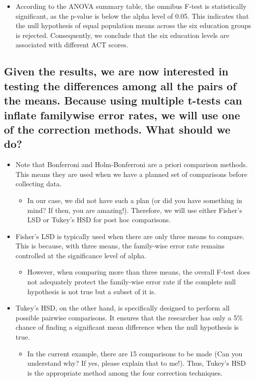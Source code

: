 \documentclass[
]{book}
\providecommand{\tightlist}{%
  \setlength{\itemsep}{0pt}\setlength{\parskip}{0pt}}
\begin{document}
\begin{itemize}
\tightlist
\item
  According to the ANOVA summary table, the omnibus F-test is statistically significant, as the p-value is below the alpha level of 0.05. This indicates that the null hypothesis of equal population means across the six education groups is rejected. Consequently, we conclude that the six education levels are associated with different ACT scores.
\end{itemize}

\subsection{Given the results, we are now interested in testing the differences among all the pairs of the means. Because using multiple t-tests can inflate familywise error rates, we will use one of the correction methods. What should we do?}\label{given-the-results-we-are-now-interested-in-testing-the-differences-among-all-the-pairs-of-the-means.-because-using-multiple-t-tests-can-inflate-familywise-error-rates-we-will-use-one-of-the-correction-methods.-what-should-we-do}

\begin{itemize}
\tightlist
\item
  Note that Bonferroni and Holm-Bonferroni are a priori comparison methods. This means they are used when we have a planned set of comparisons before collecting data.

  \begin{itemize}
  \tightlist
  \item
    In our case, we did not have such a plan (or did you have something in mind? If then, you are amazing!). Therefore, we will use either Fisher's LSD or Tukey's HSD for post hoc comparisons.
  \end{itemize}
\item
  Fisher's LSD is typically used when there are only three means to compare. This is because, with three means, the family-wise error rate remains controlled at the significance level of alpha.

  \begin{itemize}
  \tightlist
  \item
    However, when comparing more than three means, the overall F-test does not adequately protect the family-wise error rate if the complete null hypothesis is not true but a subset of it is.
  \end{itemize}
\item
  Tukey's HSD, on the other hand, is specifically designed to perform all possible pairwise comparisons. It ensures that the researcher has only a 5\% chance of finding a significant mean difference when the null hypothesis is true.

  \begin{itemize}
  \tightlist
  \item
    In the current example, there are 15 comparisons to be made (Can you understand why? If yes, please explain that to me!). Thus, Tukey's HSD is the appropriate method among the four correction techniques.
  \end{itemize}
\end{itemize}
\end{document}
